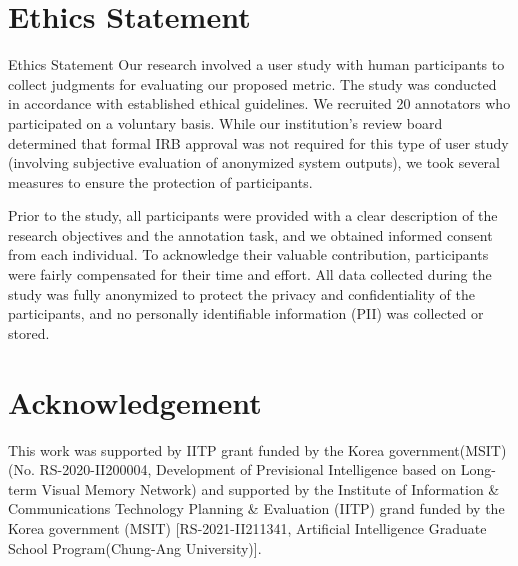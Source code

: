\section*{Ethics Statement}
Ethics Statement
Our research involved a user study with human participants to collect judgments for evaluating our proposed metric. The study was conducted in accordance with established ethical guidelines. We recruited 20 annotators who participated on a voluntary basis. While our institution's review board determined that formal IRB approval was not required for this type of user study (involving subjective evaluation of anonymized system outputs), we took several measures to ensure the protection of participants.

Prior to the study, all participants were provided with a clear description of the research objectives and the annotation task, and we obtained informed consent from each individual. To acknowledge their valuable contribution, participants were fairly compensated for their time and effort. All data collected during the study was fully anonymized to protect the privacy and confidentiality of the participants, and no personally identifiable information (PII) was collected or stored.

\section*{Acknowledgement}
This work was supported by IITP grant funded by the Korea government(MSIT) (No. RS-2020-II200004, Development of Previsional Intelligence based on Long-term Visual Memory Network) and supported by the Institute of Information \& Communications Technology Planning \& Evaluation (IITP) grand funded by the Korea government (MSIT) [RS-2021-II211341, Artificial Intelligence Graduate School Program(Chung-Ang University)].